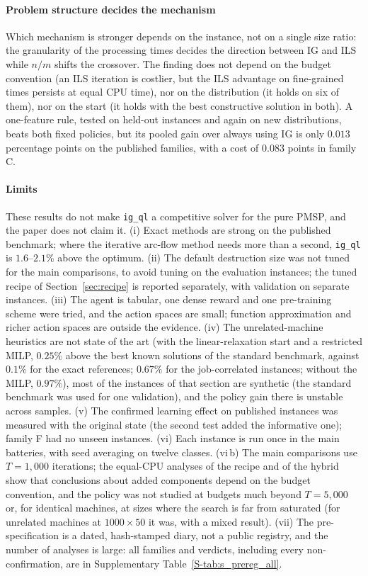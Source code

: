 \documentclass[final,3p,times,11pt,authoryear]{elsarticle}
\begin{document}
\paragraph{Problem structure decides the mechanism}
Which mechanism is stronger depends on the instance, not on a single size ratio:
the granularity of the processing times decides the direction between IG and ILS
while $n/m$ shifts the crossover. The finding does not depend on the budget
convention (an ILS iteration is costlier, but the ILS advantage on fine-grained
times persists at equal CPU time), nor on the distribution (it holds on six of
them), nor on the start (it holds with the best constructive solution in both). A
one-feature rule, tested on held-out instances and again on new distributions,
beats both fixed policies, but its pooled gain over always using IG is only $0.013$
percentage points on the published families, with a cost of $0.083$ points in
family C.

\paragraph{Limits}
These results do not make \texttt{ig\_ql} a competitive solver for the pure PMSP, and
the paper does not claim it. (i) Exact methods are strong on the published
benchmark; where the iterative arc-flow method needs more than a second,
\texttt{ig\_ql} is $1.6$--$2.1\%$ above the optimum. (ii) The default destruction size
was not tuned for the main comparisons, to avoid tuning on the evaluation
instances; the tuned recipe of Section~\ref{sec:recipe} is reported separately,
with validation on separate instances. (iii) The agent is tabular, one dense reward and
one pre-training scheme were tried, and the action spaces are small; function
approximation and richer action spaces are outside the evidence. (iv) The unrelated-machine
heuristics are not state of the art (with the linear-relaxation start and a restricted MILP, $0.25\%$ above the best known solutions of the standard benchmark, against $0.1\%$ for the exact references; $0.67\%$ for the job-correlated instances; without the MILP, $0.97\%$),
most of the instances of that section are synthetic (the standard benchmark was used for one validation), and the policy gain there is unstable across samples. (v) The confirmed
learning effect on published instances was measured with the original state
(the second test added the informative one); family F had no unseen instances.
(vi) Each instance is run once in the main batteries, with seed averaging on twelve
classes. (vi\,b) The main comparisons use $T=1{,}000$ iterations; the equal-CPU analyses
of the recipe and of the hybrid show that conclusions about added components depend
on the budget convention, and the policy was not studied at budgets much beyond
$T=5{,}000$ or, for identical machines, at sizes where the search is far from saturated
(for unrelated machines at $1000\times50$ it was, with a mixed result). (vii) The pre-specification is a dated, hash-stamped diary, not a public
registry, and the number of analyses is large: all families and verdicts, including
every non-confirmation, are in Supplementary Table~\ref{S-tab:s_prereg_all}.
\end{document}
